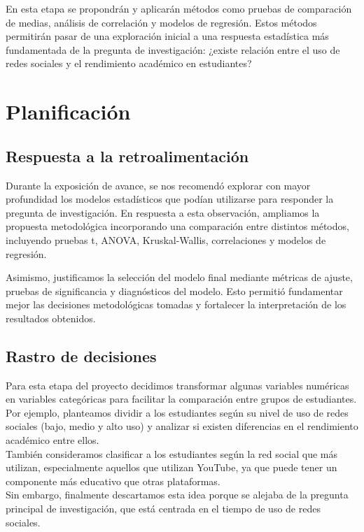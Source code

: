 \documentclass[12pt]{article}
\begin{document}
En esta etapa se propondrán y aplicarán métodos como pruebas de comparación de medias, análisis de correlación y modelos de regresión. Estos métodos permitirán pasar de una exploración inicial a una respuesta estadística más fundamentada de la pregunta de investigación: ¿existe relación entre el uso de redes sociales y el rendimiento académico en estudiantes?



\section{Planificación}
\subsection{Respuesta a la retroalimentación}
Durante la exposición de avance, se nos recomendó explorar con mayor profundidad los modelos estadísticos que podían utilizarse para responder la pregunta de investigación. En respuesta a esta observación, ampliamos la propuesta metodológica incorporando una comparación entre distintos métodos, incluyendo pruebas t, ANOVA, Kruskal-Wallis, correlaciones y modelos de regresión.

Asimismo, justificamos la selección del modelo final mediante métricas de ajuste, pruebas de significancia y diagnósticos del modelo. Esto permitió fundamentar mejor las decisiones metodológicas tomadas y fortalecer la interpretación de los resultados obtenidos.
\subsection{Rastro de decisiones}
Para esta etapa del proyecto decidimos transformar algunas variables numéricas en variables categóricas para facilitar la comparación entre grupos de estudiantes. Por ejemplo, planteamos dividir a los estudiantes según su nivel de uso de redes sociales (bajo, medio y alto uso) y analizar si existen diferencias en el rendimiento académico entre ellos.
\\

También consideramos clasificar a los estudiantes según la red social que más utilizan, especialmente aquellos que utilizan YouTube, ya que puede tener un componente más educativo que otras plataformas. 
\\

Sin embargo, finalmente descartamos esta idea porque se alejaba de la pregunta principal de investigación, que está centrada en el tiempo de uso de redes sociales.
\\
\end{document}

